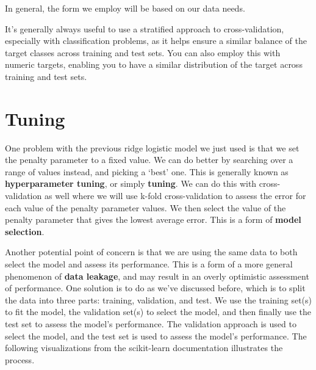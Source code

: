\documentclass[
  letterpaper,
]{krantz}
\begin{document}
In general, the form we employ will be based on our data needs.

\begin{tcolorbox}[enhanced jigsaw, leftrule=.75mm, breakable, colback=white, left=2mm, colframe=quarto-callout-tip-color-frame, toprule=.15mm, arc=.35mm, rightrule=.15mm, bottomrule=.15mm, opacityback=0]
\begin{minipage}[t]{5.5mm}
\textcolor{quarto-callout-tip-color}{\faLightbulb}
\end{minipage}%
\begin{minipage}[t]{\textwidth - 5.5mm}

It's generally always useful to use a stratified approach to
cross-validation, especially with classification problems, as it helps
ensure a similar balance of the target classes across training and test
sets. You can also employ this with numeric targets, enabling you to
have a similar distribution of the target across training and test sets.

\end{minipage}%
\end{tcolorbox}

\section{Tuning}\label{tuning}

One problem with the previous ridge logistic model we just used is that
we set the penalty parameter to a fixed value. We can do better by
searching over a range of values instead, and picking a `best' one. This
is generally known as \textbf{hyperparameter tuning}, or simply
\textbf{tuning}. We can do this with cross-validation as well where we
will use k-fold cross-validation to assess the error for each value of
the penalty parameter values. We then select the value of the penalty
parameter that gives the lowest average error. This is a form of
\textbf{model selection}.

Another potential point of concern is that we are using the same data to
both select the model and assess its performance. This is a form of a
more general phenomenon of \textbf{data leakage}, and may result in an
overly optimistic assessment of performance. One solution is to do as
we've discussed before, which is to split the data into three parts:
training, validation, and test. We use the training set(s) to fit the
model, the validation set(s) to select the model, and then finally use
the test set to assess the model's performance. The validation approach
is used to select the model, and the test set is used to assess the
model's performance. The following visualizations from the scikit-learn
documentation illustrates the process.
\end{document}
